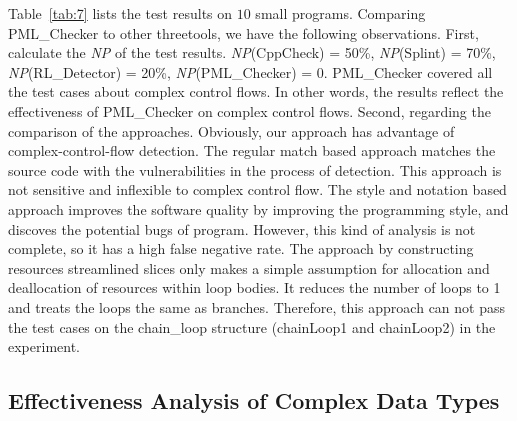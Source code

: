 Table~\ref{tab:7} lists the test results on $10$ small programs. Comparing PML\_Checker to other threetools, we have the following observations.
First, calculate the \textit{NP} of the test results. \textit{NP}(CppCheck) = 50\%, \textit{NP}(Splint) = 70\%, \textit{NP}(RL\_Detector) = 20\%, \textit{NP}(PML\_Checker) = 0. PML\_Checker covered all the test cases about complex control flows. In other words, the results reflect the effectiveness of PML\_Checker on complex control flows.
Second, regarding the comparison of the approaches. Obviously, our approach has advantage of complex-control-flow detection. The regular match based approach matches the source code with the vulnerabilities in the process of detection. This approach is not sensitive and inflexible to complex control flow. The style and notation based approach improves the software quality by improving the programming style, and discoves the potential bugs of program. However, this kind of analysis is not complete, so it has a high false negative rate. The approach by constructing resources streamlined slices only makes a simple assumption for allocation and deallocation of resources within loop bodies. It reduces the number of loops to 1 and treats the loops the same as branches. Therefore, this approach can not pass the test cases on the chain\_loop structure (chainLoop1 and chainLoop2) in the experiment. \\


\subsection{Effectiveness Analysis of Complex Data Types}

